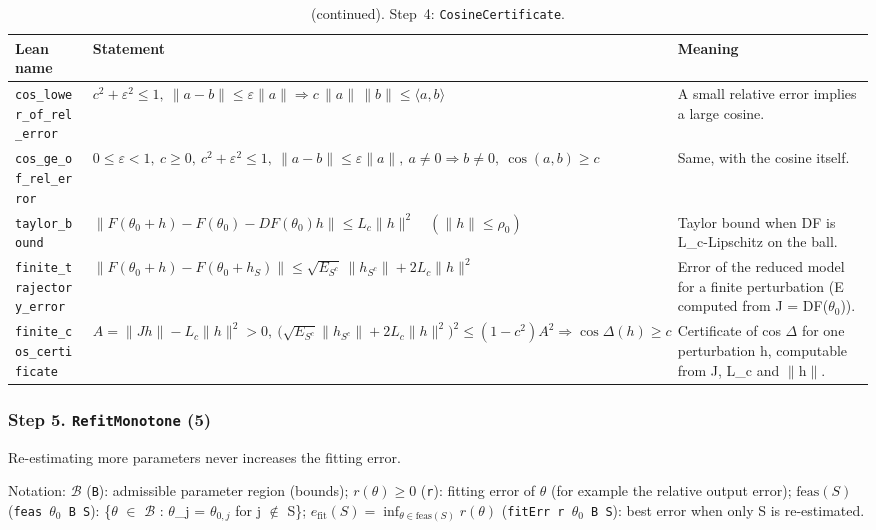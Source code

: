 \addtocounter{table}{-1}
{\small
\begin{longtable}{@{}>{\raggedright\arraybackslash}p{3.6cm}>{\raggedright\arraybackslash}p{6.6cm}>{\raggedright\arraybackslash}p{5.6cm}@{}}
\caption[]{(continued). Step~4: \texttt{CosineCertificate}.}\\
\toprule
Lean name & Statement & Meaning \\
\midrule
\endhead
\texttt{cos\_\allowbreak{}lower\_\allowbreak{}of\_\allowbreak{}rel\_\allowbreak{}error} & $\displaystyle c^2+\varepsilon^2\le1,\ \|a-b\|\le\varepsilon\|a\|\Rightarrow c\,\|a\|\,\|b\|\le\langle a,b\rangle$ & A small relative error implies a large cosine. \\[3pt]
\texttt{cos\_\allowbreak{}ge\_\allowbreak{}of\_\allowbreak{}rel\_\allowbreak{}error} & $\displaystyle 0\le\varepsilon<1,\ c\ge0,\ c^2+\varepsilon^2\le1,\ \|a-b\|\le\varepsilon\|a\|,\ a\ne0\Rightarrow b\ne0,\ \cos(a,b)\ge c$ & Same, with the cosine itself. \\[3pt]
\texttt{taylor\_\allowbreak{}bound} & $\displaystyle \|F(\theta_0+h)-F(\theta_0)-DF(\theta_0)h\|\le L_c\|h\|^2\quad(\|h\|\le\rho_0)$ & Taylor bound when DF is L\_c-Lipschitz on the ball. \\[3pt]
\texttt{finite\_\allowbreak{}trajectory\_\allowbreak{}error} & $\displaystyle \|F(\theta_0+h)-F(\theta_0+h_S)\|\le\sqrt{E_{S^c}}\,\|h_{S^c}\|+2L_c\|h\|^2$ & Error of the reduced model for a finite perturbation (E computed from J = DF($\theta_0$)). \\[3pt]
\texttt{finite\_\allowbreak{}cos\_\allowbreak{}certificate} & $\displaystyle A=\|Jh\|-L_c\|h\|^2>0,\ \bigl(\sqrt{E_{S^c}}\|h_{S^c}\|+2L_c\|h\|^2\bigr)^2\le(1-c^2)A^2\Rightarrow\cos\Delta(h)\ge c$ & Certificate of cos $\Delta$ for one perturbation h, computable from J, L\_c and $\|$h$\|$. \\[3pt]
\bottomrule
\end{longtable}
}

\subsubsection*{Step 5. \texttt{RefitMonotone} (5)}
Re-estimating more parameters never increases the fitting error.

{\small\raggedright Notation: $\mathcal{B}$ (\texttt{B}): admissible parameter region (bounds); $r(\theta)\ge0$ (\texttt{r}): fitting error of $\theta$ (for example the relative output error); $\mathrm{feas}(S)$ (\texttt{feas $\theta_0$ B S}): \{$\theta$ $\in$ $\mathcal B$ : $\theta$\_j = $\theta_{0,j}$ for j $\notin$ S\}; $e_{\mathrm{fit}}(S)=\inf_{\theta\in\mathrm{feas}(S)}r(\theta)$ (\texttt{fitErr r $\theta_0$ B S}): best error when only S is re-estimated.}

